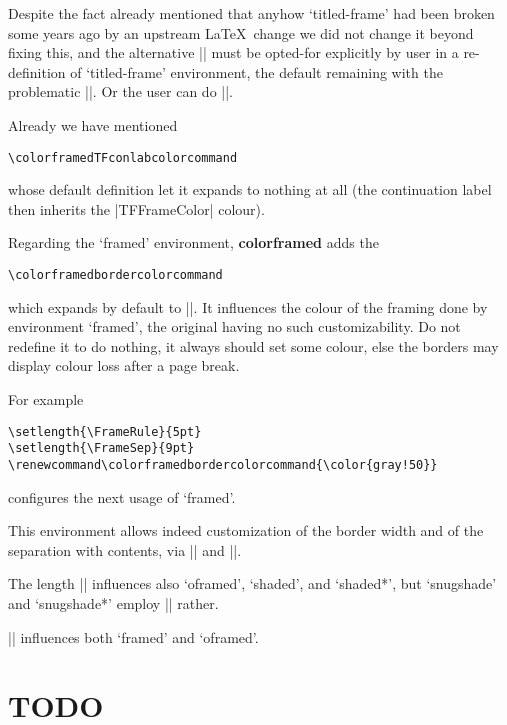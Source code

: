 \documentclass[a4paper,dvipdfmx,10pt,english]{article}
\def\colorframedTFconlabcolorcommand{\color{purple}}
\def\colorframedbordercolorcommand{\color{red!20}}
\newcommand\colorframed{%
        \texorpdfstring{{\color{joli}\bfseries colorframed}}{colorframed}\xspace}
\begin{document}
\begin{footnotesize}
  Despite the fact already
  mentioned that anyhow `titled-frame' had been broken some years ago by an
  upstream \LaTeX\ change we did not change it beyond
  fixing this, and the alternative || must be
  opted-for explicitly by user in a re-definition of `titled-frame'
  environment, the default remaining with the problematic
  |\TitleBarFrame|. Or the user can do |\let\TitleBarFrame\colorframedTitleBarFrame|.
  \par
\end{footnotesize}

Already we have mentioned
\begin{verbatim}
\colorframedTFconlabcolorcommand
\end{verbatim}
whose default definition let it expands to nothing at all (the continuation label
then inherits the |TFFrameColor| colour).

Regarding the `framed' environment, \colorframed adds the
\begin{verbatim}
\colorframedbordercolorcommand
\end{verbatim}
which expands by default to |\normalcolor|.  It influences the colour of the
framing done by environment `framed', the original having no such
customizability.  Do not redefine it to do nothing, it always should set some
colour, else the borders may display colour loss after a page break.

For example
\begin{verbatim}
\setlength{\FrameRule}{5pt}
\setlength{\FrameSep}{9pt}
\renewcommand\colorframedbordercolorcommand{\color{gray!50}}
\end{verbatim}
configures the next usage of `framed'.

\setlength{\FrameRule}{5pt}
\setlength{\FrameSep}{9pt}
\renewcommand\colorframedbordercolorcommand{\color{gray!50}}
\begin{framed}
  This environment allows indeed customization of the border width
  and of the separation with contents, via |\FrameRule| and
  |\FrameSep|.

  The length |\FrameSep| influences also `oframed', `shaded', and `shaded*',
  but `snugshade' and `snugshade*' employ |\fboxsep| rather.

  |\FrameRule| influences both `framed' and `oframed'.
\end{framed}

\section{TODO}
\end{document}
